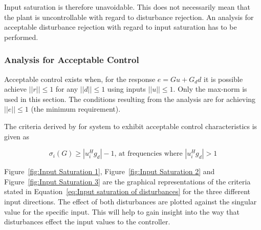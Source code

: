 Input saturation is therefore unavoidable. This does not necessarily mean that the plant is uncontrollable with regard to disturbance rejection. An analysis for acceptable disturbance rejection with regard to input saturation has to be performed.

\subsubsection{Analysis for Acceptable Control}
\label{sec:Analysis for acceptable control:disturbances}
 Acceptable control exists when, for the response $e = Gu+G_dd$ it is possible achieve $||r||\leq1$ for any $||d||\leq1$ using inputs $||u||\leq1$. Only the max-norm is used in this section. The conditions resulting from the analysis are for achieving $||e||\leq1$ (the minimum requirement).
 
 The criteria derived by \textcite{skogestad} for system to exhibit acceptable control characteristics is given as
 
 \begin{equation}
 	\label{eq:Input saturation of disturbances}
 	\sigma_i(G) \geq |u_i^Hg_d| -1 \textrm{, at frequencies where } |u_i^Hg_d|>1
 \end{equation}
 
 Figure~\ref{fig:Input Saturation 1}, Figure~\ref{fig:Input Saturation 2} and Figure~\ref{fig:Input Saturation 3} are the graphical representations of the criteria stated in Equation~\ref{eq:Input saturation of disturbances} for the three different input directions. The effect of both disturbances are plotted against the singular value for the specific input. This will help to gain insight into the way that disturbances effect the input values to the controller.
 
